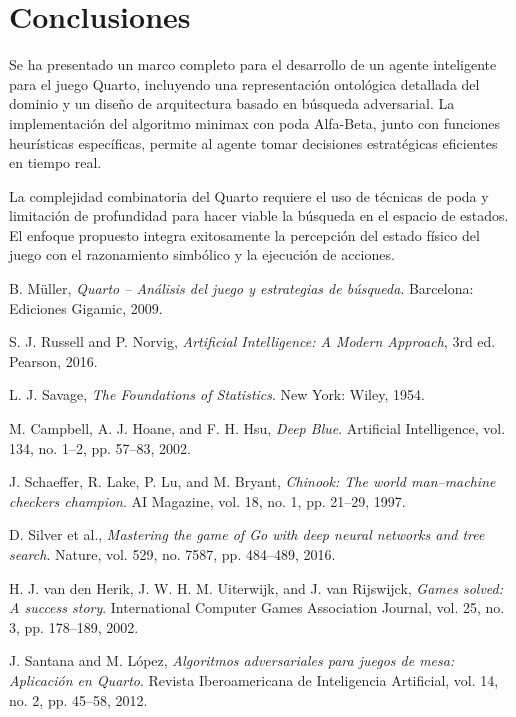 \documentclass[conference]{IEEEtran}
\begin{document}
\section{Conclusiones}

Se ha presentado un marco completo para el desarrollo de un agente inteligente para el juego Quarto, incluyendo una representación ontológica detallada del dominio y un diseño de arquitectura basado en búsqueda adversarial. La implementación del algoritmo minimax con poda Alfa-Beta, junto con funciones heurísticas específicas, permite al agente tomar decisiones estratégicas eficientes en tiempo real.

La complejidad combinatoria del Quarto requiere el uso de técnicas de poda y limitación de profundidad para hacer viable la búsqueda en el espacio de estados. El enfoque propuesto integra exitosamente la percepción del estado físico del juego con el razonamiento simbólico y la ejecución de acciones.

\begin{thebibliography}{9}
	
	B. Müller, \textit{Quarto – Análisis del juego y estrategias de búsqueda}. Barcelona: Ediciones Gigamic, 2009.
	
	S. J. Russell and P. Norvig, \textit{Artificial Intelligence: A Modern Approach}, 3rd ed. Pearson, 2016.
	
	L. J. Savage, \textit{The Foundations of Statistics}. New York: Wiley, 1954.
	
	M. Campbell, A. J. Hoane, and F. H. Hsu, \textit{Deep Blue}. Artificial Intelligence, vol. 134, no. 1–2, pp. 57–83, 2002.
	
	J. Schaeffer, R. Lake, P. Lu, and M. Bryant, \textit{Chinook: The world man–machine checkers champion}. AI Magazine, vol. 18, no. 1, pp. 21–29, 1997.
	
	D. Silver et al., \textit{Mastering the game of Go with deep neural networks and tree search}. Nature, vol. 529, no. 7587, pp. 484–489, 2016.
	
	H. J. van den Herik, J. W. H. M. Uiterwijk, and J. van Rijswijck, \textit{Games solved: A success story}. International Computer Games Association Journal, vol. 25, no. 3, pp. 178–189, 2002.
	
	J. Santana and M. López, \textit{Algoritmos adversariales para juegos de mesa: Aplicación en Quarto}. Revista Iberoamericana de Inteligencia Artificial, vol. 14, no. 2, pp. 45–58, 2012.
	
\end{thebibliography}
\end{document}

